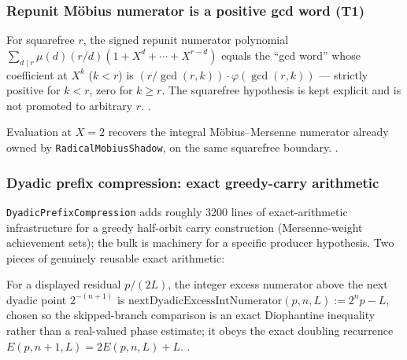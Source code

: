 \subsubsection{Repunit Möbius numerator is a positive gcd word (T1)}
\label{repunit-gcd-word}

\begin{thm}[T1]
For squarefree $r$, the signed repunit numerator polynomial
$\sum_{d\mid r}\mu(d)(r/d)(1+X^d+\cdots+X^{r-d})$ equals the ``gcd word''
whose coefficient at $X^k$ ($k<r$) is $(r/\gcd(r,k))\cdot\varphi(\gcd(r,k))$
--- strictly positive for $k<r$, zero for $k\ge r$. The squarefree
hypothesis is kept explicit and is not promoted to arbitrary $r$.
\quad {}
\quad {} \quad {} \quad {}.
\end{thm}

\begin{cor}
Evaluation at $X=2$ recovers the integral Möbius--Mersenne numerator already
owned by \texttt{RadicalMobiusShadow}, on the same squarefree boundary.
\quad {} \quad {} \quad {}.
\end{cor}

\subsubsection{Dyadic prefix compression: exact greedy-carry arithmetic}

\texttt{DyadicPrefixCompression} adds roughly 3200 lines of exact-arithmetic
infrastructure for a greedy half-orbit carry construction (Mersenne-weight
achievement sets); the bulk is machinery for a specific producer hypothesis.
Two pieces of genuinely reusable exact arithmetic:

\begin{defn}
For a displayed residual $p/(2L)$, the integer excess numerator above the
next dyadic point $2^{-(n+1)}$ is
$\mathrm{nextDyadicExcessIntNumerator}(p,n,L) := 2^n p - L$, chosen so the
skipped-branch comparison is an exact Diophantine inequality rather than a
real-valued phase estimate; it obeys the exact doubling recurrence
$E(p,n{+}1,L) = 2E(p,n,L) + L$.
\quad {}
\quad {} \quad {} \quad {}.
\end{defn}

